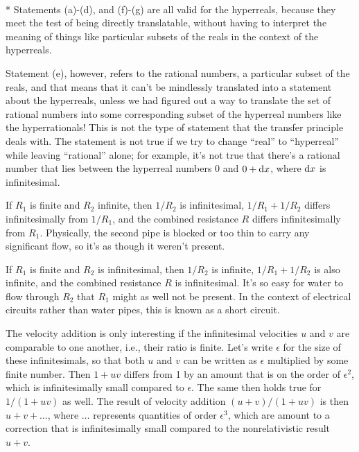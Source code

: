 \\*
Statements (a)-(d), and (f)-(g) are all valid for the hyperreals, because they meet the test of being
directly translatable, without having to interpret the meaning of things like particular
subsets of the reals in the context of the hyperreals.

Statement (e), however, refers to the
rational numbers, a particular subset of the reals, and that means that it can't be
mindlessly translated into a statement about the hyperreals, unless we had figured out
a way to translate the set of rational numbers into some corresponding subset of the
hyperreal numbers like the hyperrationals! This is not the type of statement that the
transfer principle deals with. The statement is not true if we try to change ``real''
to ``hyperreal'' while leaving ``rational'' alone; for example, it's not true that there's
a rational number that lies between the hyperreal numbers 0 and $0+\textup{d} x$, where $\textup{d} x$
is infinitesimal.

If $R_1$ is finite and $R_2$ infinite, then $1/R_2$ is infinitesimal,
$1/R_1+1/R_2$ differs infinitesimally from $1/R_1$, and the combined resistance $R$ differs infinitesimally
from $R_1$. Physically, the second pipe is blocked or too thin to carry any significant flow,
so it's as though it weren't present.

If $R_1$ is finite and $R_2$ is infinitesimal, then $1/R_2$ is infinite, $1/R_1+1/R_2$ is
also infinite, and the combined resistance $R$ is infinitesimal. It's so easy for water to
flow through $R_2$ that $R_1$ might as well not be present. In the context of electrical circuits
rather than water pipes, this is known as a short circuit.

The velocity addition is only interesting if the infinitesimal velocities $u$ and $v$ are comparable
to one another, i.e., their ratio is finite. Let's write $\epsilon$ for the size of these infinitesimals,
so that both $u$ and $v$ can be written as $\epsilon$ multiplied by some finite number.
Then $1+uv$ differs from 1 by an amount that is on the order of $\epsilon^2$, which is infinitesimally
small compared to $\epsilon$. The same then holds true for $1/(1+uv)$ as well. The result of velocity
addition $(u+v)/(1+uv)$ is then $u+v+\ldots$, where $\ldots$ represents quantities of order
$\epsilon^3$, which are amount to a correction that is infinitesimally small compared to the nonrelativistic
result $u+v$.

